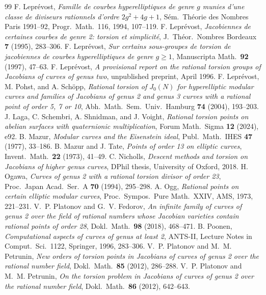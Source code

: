 \documentclass[10pt]{amsart}
\begin{document}
\begin{thebibliography}{99}
 F. Lepr\'evost, \emph{Famille de courbes hyperelliptiques de genre $g$ munies d'une classe de diviseurs rationnels d'ordre $2g^2+4g+1$}, S\'em.\ Th\'eorie des Nombres Paris 1991--92, Progr.\ Math.\ 116, 1994, 107--119.
 F. Lepr\'evost, \emph{Jacobiennes de certaines courbes de genre 2: torsion et simplicit\'e}, J.~Th\'eor.\ Nombres Bordeaux \textbf{7} (1995), 283--306.
 F. Lepr\'evost, \emph{Sur certains sous-groupes de torsion de jacobiennes de courbes hyperelliptiques de genre $g\ge 1$}, Manuscripta Math.\ \textbf{92} (1997), 47--63.
 F. Lepr\'evost, \emph{A provisional report on the rational torsion groups of Jacobians of curves of genus two}, unpublished preprint, April 1996.
 F. Lepr\'evost, M. Pohst, and A. Sch\"opp, \emph{Rational torsion of $J_0(N)$ for hyperelliptic modular curves and families of Jacobians of genus 2 and genus 3 curves with a rational point of order 5, 7 or 10}, Abh.\ Math.\ Sem.\ Univ.\ Hamburg \textbf{74} (2004), 193--203.
 J. Laga, C. Schembri, A. Shnidman, and J. Voight, \emph{Rational torsion points on abelian surfaces with quaternionic multiplication}, Forum Math.\ Sigma \textbf{12} (2024), e92.
 B. Mazur, \emph{Modular curves and the Eisenstein ideal}, Publ.\ Math.\ IHES \textbf{47} (1977), 33--186.
 B. Mazur and J. Tate, \emph{Points of order 13 on elliptic curves}, Invent.\ Math.\ \textbf{22} (1973), 41--49.
 C. Nicholls, \emph{Descent methods and torsion on Jacobians of higher genus curves}, DPhil thesis, University of Oxford, 2018.
 H. Ogawa, \emph{Curves of genus 2 with a rational torsion divisor of order 23}, Proc.\ Japan Acad.\ Ser.\ A \textbf{70} (1994), 295--298.
 A. Ogg, \emph{Rational points on certain elliptic modular curves}, Proc.\ Sympos.\ Pure Math.\ XXIV, AMS, 1973, 221--231.
 V.~P. Platonov and G.~V. Fedorov, \emph{An infinite family of curves of genus 2 over the field of rational numbers whose Jacobian varieties contain rational points of order 28}, Dokl.\ Math.\ \textbf{98} (2018), 468--471.
 B. Poonen, \emph{Computational aspects of curves of genus at least 2}, ANTS-II, Lecture Notes in Comput.\ Sci.\ 1122, Springer, 1996, 283--306.
 V.~P. Platonov and M.~M. Petrunin, \emph{New orders of torsion points in Jacobians of curves of genus 2 over the rational number field}, Dokl.\ Math.\ \textbf{85} (2012), 286--288.
 V.~P. Platonov and M.~M. Petrunin, \emph{On the torsion problem in Jacobians of curves of genus 2 over the rational number field}, Dokl.\ Math.\ \textbf{86} (2012), 642--643.

\end{thebibliography}
\end{document}
